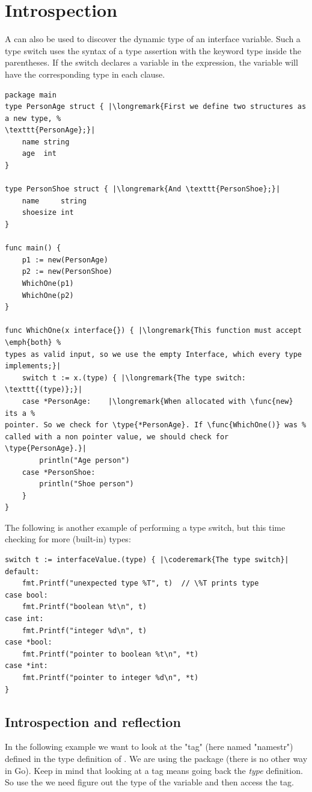 \section{Introspection}
A  can also be used to discover the dynamic type of an interface
variable. Such a type switch uses
the syntax of a type assertion with the keyword type inside the
parentheses. If the switch declares a variable in the expression, the
variable will have the corresponding type in each clause.
\begin{lstlisting}[caption=Dynamically find out the type]
package main
type PersonAge struct { |\longremark{First we define two structures as a new type, %
\texttt{PersonAge};}|
	name string
	age  int
}

type PersonShoe struct { |\longremark{And \texttt{PersonShoe};}|
	name     string
	shoesize int
}

func main() {
	p1 := new(PersonAge)
	p2 := new(PersonShoe)
	WhichOne(p1)
	WhichOne(p2)
}

func WhichOne(x interface{}) { |\longremark{This function must accept \emph{both} %
types as valid input, so we use the empty Interface, which every type implements;}|
	switch t := x.(type) { |\longremark{The type switch: \texttt{(type)};}|
	case *PersonAge:	|\longremark{When allocated with \func{new} its a %
pointer. So we check for \type{*PersonAge}. If \func{WhichOne()} was %
called with a non pointer value, we should check for \type{PersonAge}.}|
		println("Age person")
	case *PersonShoe:
		println("Shoe person")
	}
}
\end{lstlisting}
\showremarks

The following is another example of performing a type switch, but this
time checking for more (built-in) types:
\begin{lstlisting}[caption=A more generic type switch]
switch t := interfaceValue.(type) { |\coderemark{The type switch}|
default:
    fmt.Printf("unexpected type %T", t)  // \%T prints type
case bool:
    fmt.Printf("boolean %t\n", t)
case int:
    fmt.Printf("integer %d\n", t)
case *bool:
    fmt.Printf("pointer to boolean %t\n", *t)
case *int:
    fmt.Printf("pointer to integer %d\n", *t)
}
\end{lstlisting}

\subsection{Introspection and reflection}
\label{subsec:introspection and reflection}
In the following example we want to look at the "tag" (here named
"namestr") defined in the
type definition of . We are using the
 package (there is no other way in Go). Keep in mind
that looking at a tag means going back the \emph{type} definition. So
use the  we need figure out the type of the variable
and then access the tag.

